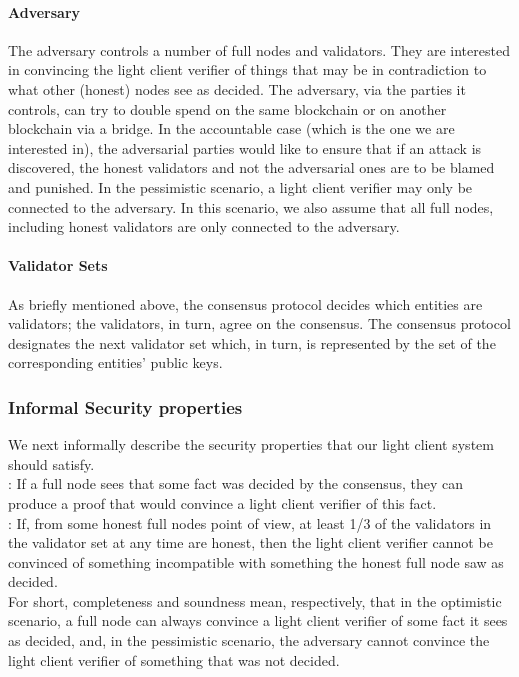 \paragraph{Adversary} The adversary controls a number of full nodes and validators. They are interested in convincing the light client verifier of things 
that may be in contradiction to what other (honest) nodes see as decided. The adversary, via the parties it controls, can try to  
double spend on the same blockchain or on another blockchain via a bridge. In the accountable case (which is the one we are interested in), 
the adversarial parties would like to ensure that if an attack is discovered, the honest validators and not the adversarial ones are to be blamed and punished.
In the pessimistic scenario, a light client verifier may only be connected to the adversary. In this scenario, we also assume that all full nodes, including honest 
validators are only connected to the adversary.

\paragraph{Validator Sets} As briefly mentioned above, the consensus protocol decides which entities are validators; the validators, in turn, agree on the consensus. 
The consensus protocol designates the next validator set which, in turn, is represented by the set of the corresponding entities' public keys. 

\subsubsection{Informal Security properties}
\noindent We next informally describe the security properties that our light client system should satisfy. \\

: If a full node sees that some fact was decided by the consensus, they can produce a proof that would convince a light client verifier of this fact.\\

:  If, from some honest full nodes point of view, at least 1/3 of the validators in the validator set at any time are honest, then the light client verifier 
cannot be convinced of something incompatible with something the honest full node saw as decided. \\

\noindent For short, completeness and soundness mean, respectively, that in the optimistic scenario, 
a full node can always convince a light client verifier of some fact it sees as decided, and, in the pessimistic scenario, 
the adversary cannot convince the light client verifier of something that was not decided. 

